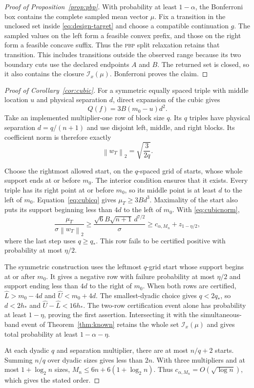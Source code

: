 \documentclass{interact}
\theoremstyle{definition}
\theoremstyle{remark}
\newcommand{\I}{\mathcal{I}}
\newcommand{\norm}[1]{\left\lVert #1\right\rVert_2}
\newcommand{\PBP}{\textnormal{\textsc{pbp}}\xspace}
\begin{document}
\begin{proof}[Proof of Proposition~\ref{prop:pbp}]
With probability at least $1-\alpha$, the Bonferroni box contains the complete
sampled mean vector $\mu$.  Fix a transition in the unclosed set inside
\eqref{eq:design-target} and choose a compatible continuation $g$.  The sampled
values on the left form a feasible convex prefix, and those on the right form
a feasible concave suffix.  Thus the \PBP split relaxation retains that
transition.  This includes transitions outside the observed range because its
two boundary cuts use the declared endpoints $A$ and $B$.  The returned set is
closed, so it also contains the closure $\I_x(\mu)$.  Bonferroni proves the
claim.
\end{proof}

\begin{proof}[Proof of Corollary~\ref{cor:cubic}]
For a symmetric equally spaced triple with middle location $u$ and physical
separation $d$, direct expansion of the cubic gives
\begin{equation}
  Q(f)=3B(m_0-u)d^2.
\label{eq:cubicq}
\end{equation}
Take an implemented multiplier-one row of block size $q$.  Its $q$ triples
have physical separation $d=q/(n+1)$ and use disjoint left, middle, and right
blocks.  Its coefficient norm is therefore exactly
\begin{equation}
  \norm{w_T}=\sqrt{\frac{3}{2q}}.
\label{eq:cubicnorm}
\end{equation}

Choose the rightmost allowed start, on the $q$-spaced grid of starts, whose
whole support ends at or before $m_0$.  The interior condition ensures that it
exists.  Every triple has its right point at or before $m_0$, so its middle
point is at least $d$ to the left of $m_0$.  Equation~\eqref{eq:cubicq} gives
$\mu_T\geq3Bd^3$.  Maximality of the start also puts its support beginning less
than $4d$ to the left of $m_0$.  With \eqref{eq:cubicnorm},
\[
  \frac{\mu_T}{\sigma\norm{w_T}}
  \geq\frac{\sqrt6B\sqrt{n+1}\,d^{7/2}}{\sigma}
  \geq c_{\alpha,M_n}+z_{1-\eta/2},
\]
where the last step uses $q\geq q_*$.  This row fails to be certified positive
with probability at most $\eta/2$.

The symmetric construction uses the leftmost $q$-grid start whose support
begins at or after $m_0$.  It gives a negative row with failure probability at
most $\eta/2$ and support ending less than $4d$ to the right of $m_0$.
When both rows are certified,
$\widehat L>m_0-4d$ and $\widehat U<m_0+4d$.  The smallest-dyadic choice gives
$q<2q_*$, so $d<2h_*$ and
$\widehat U-\widehat L<16h_*$.  The two-row certification event alone has
probability at least $1-\eta$, proving the first assertion.  Intersecting it
with the simultaneous-band event of Theorem~\ref{thm:known} retains the whole
set $\I_x(\mu)$ and gives total probability at least $1-\alpha-\eta$.

At each dyadic $q$ and separation multiplier, there are at most $n/q+2$
starts.  Summing $n/q$ over dyadic sizes gives less than $2n$.  With three
multipliers and at most $1+\log_2n$ sizes,
$M_n\leq6n+6(1+\log_2n)$.  Thus
$c_{\alpha,M_n}=O(\sqrt{\log n})$, which gives the stated order.
\end{proof}
\end{document}
